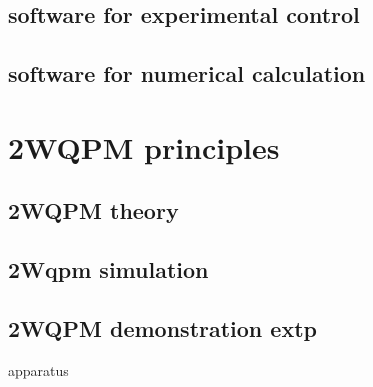 \documentclass[t, aspectratio=169]{beamer}
\begin{document}
\subsection{software for experimental control}



\subsection{software for numerical calculation}





\section{2WQPM principles}
\begin{frame}{\secname}
	\tableofcontents[currentsection, hideothersubsections, sectionstyle=hide/hide]
\end{frame}

\subsection{2WQPM theory}



\subsection{2Wqpm simulation}


\subsection{2WQPM demonstration extp}

\begin{frame}{apparatus}

\end{frame}
\end{document}
